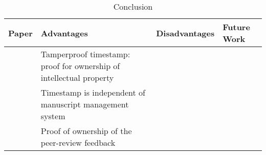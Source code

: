 \begin{longtable}{ |c|p{4cm}|p{4cm}|p{4cm}| }
	\caption{Conclusion}
	\label{tab:rq10_conclusion}\\
	\hline
 	\textbf{Paper} & \textbf{Advantages} & \textbf{Disadvantages} & \textbf{Future Work}\\ [0.5ex] 
 	\hline\hline
 	\endhead
 	\multirow{3}{*}{\cite{2017_Gipp}} & Tamperproof timestamp: proof for ownership of intellectual property & \multirow{3}{*}{\xmark } & \\
	\cline{2-2}
	 & Timestamp is independent of manuscript management system & & \\
	\cline{2-2}
	 & Proof of ownership of the peer-review feedback & & \\
	\hline
\end{longtable}
